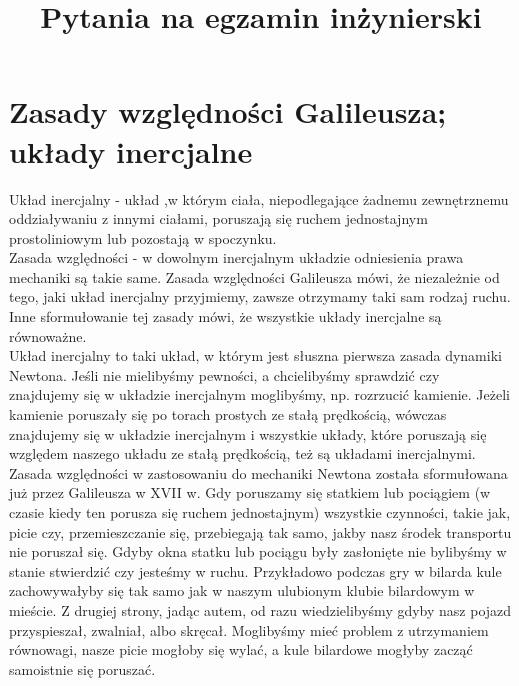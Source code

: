 \documentclass{article}
\title{Pytania na egzamin inżynierski}
\begin{document}
\maketitle

\section{Zasady względności Galileusza; układy inercjalne}

Układ inercjalny - układ ,w którym ciała, niepodlegające żadnemu zewnętrznemu oddziaływaniu z innymi ciałami, poruszają się ruchem jednostajnym prostoliniowym lub pozostają w spoczynku.  \\

\noindent Zasada względności - w dowolnym inercjalnym układzie odniesienia prawa mechaniki są takie same. 
Zasada względności Galileusza mówi, że niezależnie od tego, jaki układ inercjalny przyjmiemy, zawsze otrzymamy taki sam rodzaj ruchu. Inne sformułowanie tej zasady mówi, że wszystkie układy inercjalne są równoważne. \\

\noindent Układ inercjalny to taki układ, w którym jest słuszna pierwsza zasada dynamiki Newtona. Jeśli nie mielibyśmy pewności, a chcielibyśmy sprawdzić czy znajdujemy się w układzie inercjalnym moglibyśmy, np. rozrzucić kamienie. Jeżeli kamienie poruszały się po torach prostych ze stałą prędkością, wówczas znajdujemy się w układzie inercjalnym i wszystkie układy, które poruszają się względem naszego układu ze stałą prędkością, też są układami inercjalnymi.
Zasada względności w zastosowaniu do mechaniki Newtona została sformułowana już
przez Galileusza w XVII w. Gdy poruszamy się statkiem lub pociągiem (w czasie kiedy ten porusza się ruchem jednostajnym) wszystkie czynności, takie jak, picie czy, przemieszczanie się, przebiegają tak samo, jakby nasz środek transportu nie poruszał się. Gdyby okna statku lub pociągu były zasłonięte nie bylibyśmy w stanie stwierdzić czy jesteśmy w ruchu. Przykładowo podczas gry w bilarda kule zachowywałyby się tak samo jak w naszym ulubionym klubie bilardowym w mieście. Z drugiej strony, jadąc autem, od razu wiedzielibyśmy gdyby nasz pojazd przyspieszał, zwalniał, albo skręcał. Moglibyśmy mieć problem z utrzymaniem równowagi, nasze picie mogłoby się wylać, a kule bilardowe mogłyby zacząć samoistnie się poruszać.
\end{document}
